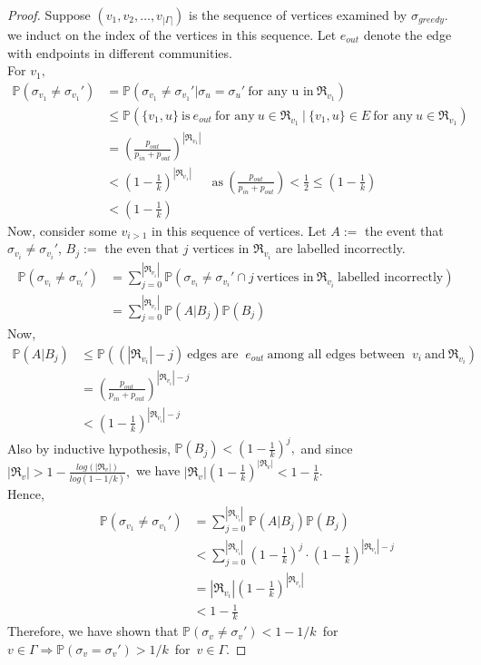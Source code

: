 \begin{proof}
    Suppose $(v_1, v_2, \ldots, v_{|\Gamma|})$ is the sequence of vertices examined by $\sigma_{greedy}$. we induct on the index of the vertices in this sequence. Let $e_{out}$ denote the edge with endpoints in different communities.\\
    For $v_1,$ \begin{align*}
    \mathbb{P}(\sigma_{v_1}\neq\sigma_{v_1}')&=\mathbb{P}(\sigma_{v_1}\neq\sigma_{v_1}'|\sigma_u=\sigma_u'~\text{for any u in}~\Re_{v_1})\\
    &\leq\mathbb{P}(\{v_1, u\}~\text{is}~e_{out}~\text{for any}~u\in\Re_{v_1}~|~\{v_1, u\}\in E~\text{for any}~u\in\Re_{v_1})\\
    &=(\frac{p_{out}}{p_{in}+p_{out}})^{|\Re_{v_1}|}\\
    &<(1-\frac{1}{k})^{|\Re_{v_1}|} ~~~~~~~\text{as}~(\frac{p_{out}}{p_{in}+p_{out}})<\frac{1}{2}\leq(1-\frac{1}{k})\\
    &<(1-\frac{1}{k})
    \end{align*}
    Now, consider some $v_{i>1}$ in this sequence of vertices. Let $A:=$ the event that $\sigma_{v_i}\neq\sigma_{v_i}'$, $B_j:=$ the even that $j$ vertices in $\Re_{v_i}$ are labelled incorrectly. \begin{align*}
    \mathbb{P}(\sigma_{v_i}\neq\sigma_{v_i}')&=\sum_{j=0}^{|\Re_{v_i}|}\mathbb{P}(\sigma_{v_i}\neq\sigma_{v_i}'\cap j~\text{vertices in}~\Re_{v_i}~\text{labelled incorrectly})\\
    &=\sum_{j=0}^{|\Re_{v_i}|}\mathbb{P}(A|B_j)\mathbb{P}(B_j)
    \end{align*}
Now, \begin{align*}
    \mathbb{P}(A|B_j)&\leq\mathbb{P}((|\Re_{v_i}|-j)~\text{edges are }~e_{out}~\text{among all edges between }~v_i~\text{and}~\Re_{v_i})\\
    &=(\frac{p_{out}}{p_{in}+p_{out}})^{|\Re_{v_i}|-j}\\
    &<(1-\frac{1}{k})^{|\Re_{v_i}|-j}
\end{align*} 
Also by inductive hypothesis, $\mathbb{P}(B_j)<(1-\frac{1}{k})^j,$ and since $|\Re_v|>1-\frac{log(|\Re_v|)}{log(1-1/k)},$ we have $|\Re_v|(1-\frac{1}{k})^{|\Re_v|}<1-\frac{1}{k}$.\\Hence,
\begin{align*}
    ~~~~~~~~\mathbb{P}(\sigma_{v_1}\neq\sigma_{v_1}')&=\sum_{j=0}^{|\Re_{v_i}|}\mathbb{P}(A|B_j)\mathbb{P}(B_j)\\
    &<\sum_{j=0}^{|\Re_{v_i}|}(1-\frac{1}{k})^j\cdot(1-\frac{1}{k})^{|\Re_{v_i}|-j}\\
    &=|\Re_{v_i}|(1-\frac{1}{k})^{|\Re_{v_i}|}\\
    &<1-\frac{1}{k}
\end{align*}
Therefore, we have shown that $\mathbb{P}(\sigma_{v}\neq\sigma_{v}')<1-1/k$~for~$v\in\Gamma \Rightarrow\mathbb{P}(\sigma_{v}=\sigma_{v}')>1/k$~for~$v\in\Gamma.$
\end{proof}
